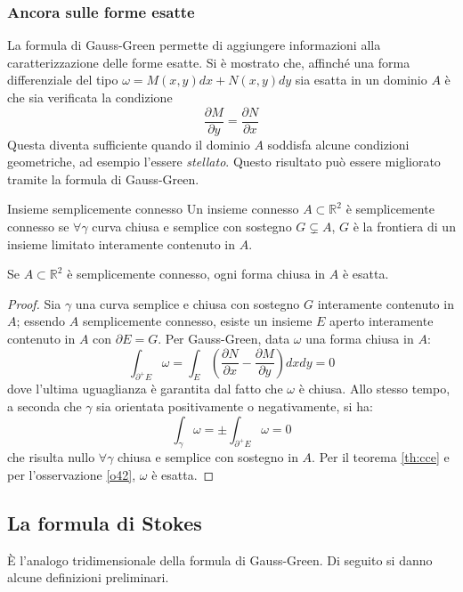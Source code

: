 \documentclass[10pt, a4paper]{scrartcl}
\theoremstyle{definition}
\numberwithin{esempio}{section}
\theoremstyle{definition}
\numberwithin{obs}{section}
\numberwithin{nota}{section}
\numberwithin{equation}{subsection}
\begin{document}
\subsubsection{Ancora sulle forme esatte}
La formula di Gauss-Green permette di aggiungere informazioni alla caratterizzazione delle forme esatte.
Si \`e mostrato che, affinch\'e una forma differenziale del tipo $\omega = M(x,y) dx+ N(x,y)  dy $ sia esatta in un dominio $A$ \`e che sia verificata la condizione
\[
\frac{\partial M}{\partial y}  = \frac{\partial N}{\partial x} 
\] 
Questa diventa sufficiente quando il dominio $A$ soddisfa alcune condizioni geometriche, ad esempio l'essere \textit{stellato}. 
Questo risultato pu\`o essere migliorato tramite la formula di Gauss-Green.
\begin{definizione}
	{Insieme semplicemente connesso}{}
	Un insieme connesso $A \subset \mathbb{R}^{2} $ \`e semplicemente connesso se $\forall \gamma$ curva chiusa e semplice con sostegno $G \subsetneq A$, $G$ \`e la frontiera di un insieme limitato interamente contenuto in $A$.
\end{definizione}
\begin{teorema}
	{}{}
	Se $A \subset \mathbb{R}^2$ \`e semplicemente connesso, ogni forma chiusa in $A$ \`e esatta.
	\begin{proof}
		Sia $\gamma$ una curva semplice e chiusa con sostegno $G$ interamente contenuto in $A$; essendo $A$ semplicemente connesso, esiste un insieme $E $ aperto interamente contenuto in $A$ con $\partial E =  G$.
		Per Gauss-Green, data $\omega$ una forma chiusa in $A$:
		\[
		\int_{\partial ^+ E} \omega = \int_{E} \left(\frac{\partial N}{\partial x} - \frac{\partial M}{\partial y} \right) dxdy = 0
		\] 
		dove l'ultima uguaglianza \`e garantita dal fatto che $\omega $ \`e chiusa.
		Allo stesso tempo, a seconda che $\gamma$ sia orientata positivamente o negativamente, si ha:
		\[
		\int_{\gamma} \omega = \pm \int_{\partial ^+ E } \omega = 0
		\] 
		che risulta nullo $\forall \gamma$ chiusa e semplice con sostegno in $A$. 
		Per il teorema \ref{th:cce} e per l'osservazione \ref{o42}, $\omega $ \`e esatta.
	\end{proof}
\end{teorema}
\subsection{La formula di Stokes}

\`E l'analogo tridimensionale della formula di Gauss-Green. 
Di seguito si danno alcune definizioni preliminari.
\end{document}
